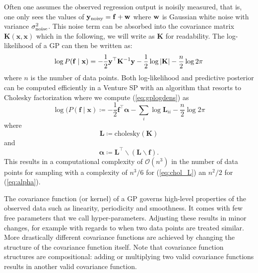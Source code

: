 Often one assumes the observed regression output is noisily measured, that is, one only sees the values of $\mathbf{y}_{\textrm{noisy}} = \mathbf{f}+ \mathbf{w}$ where $\mathbf{w}$ is Gaussian white noise with variance $\sigma_{\textrm{noise}}^2$. This noise term can be absorbed into the covariance matrix $\mathbf{K}(\mathbf{x},\mathbf{x})$ which in the following, we will write as $\mathbf{K}$ for readability. The log-likelihood of a \ac{GP} can then be written as:
\begin{equation}
\label{eq:gplogdens}
\log P(\mathbf{f} \mid \mathbf{x}) =
-\frac12 \mathbf{y}^\top 
\mathbf{K}^{-1} \mathbf{y}
- \frac12\log \left\lvert \mathbf{K} \right\rvert
- \frac{n}{2}\log 2\pi
\end{equation}
where $n$ is the number of data points.
Both log-likelihood and predictive posterior can be computed efficiently in a Venture SP with an algorithm that resorts to Cholesky factorization\citep[chap. 2]{rasmussen2006gaussian} where 
we compute (\ref{eq:gplogdens}) as
\begin{equation}
\log(P(\mathbf{f}\mid \mathbf{x})\coloneqq - \frac{1}{2} \mathbf{f}^\top \bm{\alpha} - \sum_i \log \mathbf{L}_{ii} - \frac{n}{2} \log 2 \pi
\end{equation}
where 
\begin{equation}
\label{eq:chol_L}
\mathbf{L} \coloneqq \text{cholesky}(\mathbf{K})
\end{equation}
and 
\begin{equation}
\label{eq:alpha}
\bm{\alpha} \coloneqq  \mathbf{L}^\top \backslash(\mathbf{L} \backslash \mathbf{f}). 
\end{equation}
This results in a computational complexity of $\mathcal{O}(n^3)$ in the number of data points for
sampling with a complexity of $n^3/6$ for (\ref{eq:chol_L}) an $n^2/2$ for (\ref{eq:alpha}). 



The covariance function (or kernel) of a \ac{GP} governs high-level properties of the observed data such as linearity, periodicity and smoothness.
It comes with few free parameters that we call hyper-parameters.
Adjusting these results in minor changes, for example with regards to when two data points are treated similar.
More drastically different covariance functions are achieved by changing the structure of the covariance function itself.
Note that covariance function structures are compositional: adding or multiplying two valid covariance functions results in another valid covariance function. 







